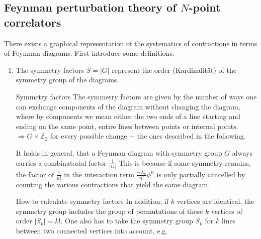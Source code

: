 \subsection{Feynman perturbation theory of $N$-point correlators}
There exists a graphical representation of the systematics of contractions in terms of Feynman diagrams. First introduce some definitions.
\begin{enumerate}
	\item The symmetry factors $S=|G|$ represent the order (Kardinalität) of the symmetry group of the diagrams.
	\begin{mybox}{Symmetry factors}
		The symmetry factors are given by the number of ways one can exchange components of the diagram without changing the diagram, where by components we mean either the two ends of a line starting and ending on the same point, entire lines between points or internal points.$\Rightarrow G\times \mathbb{Z}_2$ for every possible change $+$ the ones described in the following.
	\end{mybox}
It holds in general, that a Feynman diagram with symmetry group $G$ always carries a combinatorial factor $\frac{1}{|G|}$ This is because if some symmetry remains, the factor of $\frac{1}{n!}$ in the interaction term $\frac{- \lambda_n}{n!}\phi^n$ is only partially cancelled by counting the various contractions that yield the same diagram.
\begin{mybox}{How to calculate symmetry factors}
	In addition, if $k$ vertices are identical, the symmetry group includes the group of permutations of these $k$ vertices of order $|S_k|=k!$. One also has to take the symmetry group $S_k$ for $k$ lines between two connected vertices into account, e.g.
	

\end{mybox}
\end{enumerate}
